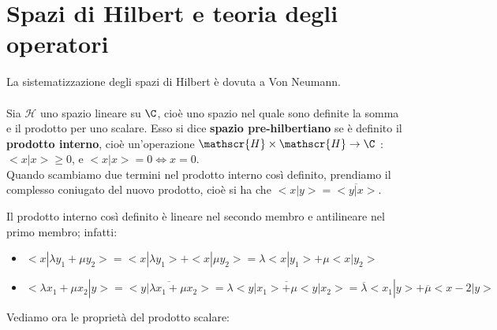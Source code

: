 \chapter{Spazi di Hilbert e teoria degli operatori}

La sistematizzazione degli spazi di Hilbert è dovuta a Von Neumann.
\\
\\
Sia $\mathscr{H}$ uno spazio lineare su $\C$, cioè uno spazio nel quale sono definite la somma e il prodotto per uno scalare. Esso si dice \textbf{spazio pre-hilbertiano} se è definito  il \textbf{prodotto interno}, cioè un'operazione $\mathscr{H} \times \mathscr{H} \to \C$ : $<x|x> \geq 0$, e $<x|x> =0 \iff x=0$.\\Quando scambiamo due termini nel prodotto interno così definito, prendiamo il complesso coniugato del nuovo prodotto, cioè si ha che $<x|y>=\overline{<y|x>}$.

Il prodotto interno così definito è lineare nel secondo membro e antilineare nel primo membro; infatti:

\begin{itemize}
\item $<x|\lambda y_1 + \mu y_2>=<x|\lambda y_1> + <x|\mu y_2> =\lambda <x|y_1> + \mu <x|y_2>$
\item $<\lambda x_1+\mu x_2|y>=\overline{<y|\lambda x_1 + \mu x_2>}=\overline{\lambda <y|x_1>+ \mu <y|x_2>} = \overline{\lambda} <x_1|y> + \overline{\mu} <x-2|y>$
\end{itemize} Vediamo ora le proprietà del prodotto scalare:

